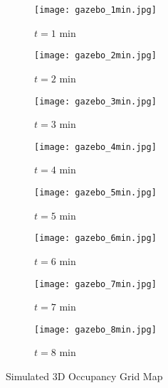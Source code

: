 \begin{figure}[!t]
    	\begin{subfigure}[t]{0.24\columnwidth}
           	\centering
          	\texttt{[image: gazebo\_1min.jpg]}
        		\caption{$t=1$ min}
    	\end{subfigure}
    	\begin{subfigure}[t]{0.24\columnwidth}
           	\centering
          	\texttt{[image: gazebo\_2min.jpg]}
        		\caption{$t=2$ min}
    	\end{subfigure}
    	\begin{subfigure}[t]{0.24\columnwidth}
           	\centering
          	\texttt{[image: gazebo\_3min.jpg]}
        		\caption{$t=3$ min}
   	\end{subfigure}
    	\begin{subfigure}[t]{0.24\columnwidth}
           	\centering
          	\texttt{[image: gazebo\_4min.jpg]}
        		\caption{$t=4$ min}
    	\end{subfigure}
	\begin{subfigure}[t]{0.24\columnwidth}
	\vspace*{0.15\columnwidth}
           	\centering
          	\texttt{[image: gazebo\_5min.jpg]}
        		\caption{$t=5$ min}
    	\end{subfigure}
    	\begin{subfigure}[t]{0.24\columnwidth}
	\vspace*{0.15\columnwidth}
           	\centering
          	\texttt{[image: gazebo\_6min.jpg]}
        		\caption{$t=6$ min}
    	\end{subfigure}
    	\begin{subfigure}[t]{0.24\columnwidth}
	\vspace*{0.15\columnwidth}
           	\centering
          	\texttt{[image: gazebo\_7min.jpg]}
        		\caption{$t=7$ min}
   	\end{subfigure}
    	\begin{subfigure}[t]{0.24\columnwidth}
	\vspace*{0.15\columnwidth}
           	\centering
          	\texttt{[image: gazebo\_8min.jpg]}
        		\caption{$t=8$ min}
    	\end{subfigure}
\caption{Simulated 3D Occupancy Grid Map}
\label{fig:sim3DMap}
\end{figure}


